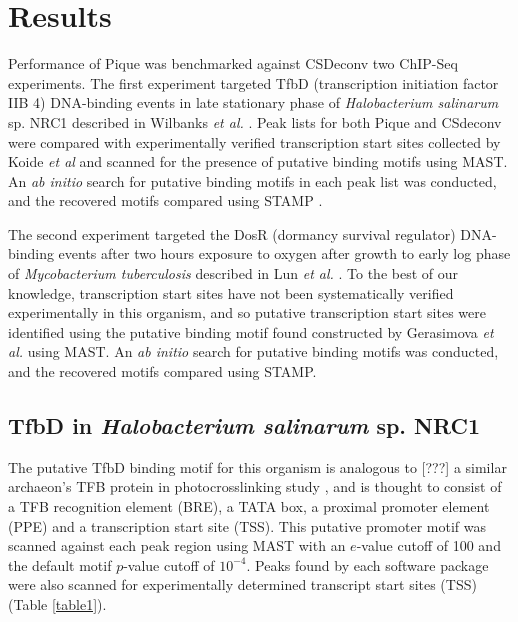 \documentclass{bioinfo}
\begin{document}
\section{Results}

Performance of Pique was benchmarked against CSDeconv two ChIP-Seq
experiments. The first experiment targeted TfbD (transcription
initiation factor IIB 4) DNA-binding events in late stationary phase
of {\em Halobacterium salinarum} sp. NRC1 described in Wilbanks {\em
  et al.} \cite{wilbanks}. Peak lists for both Pique and CSdeconv were
compared with experimentally verified transcription start sites
collected by Koide {\em et al} \cite{halo_promoters} and scanned for
the presence of putative binding motifs using MAST\cite{MAST}. An {\em
  ab initio} search for putative binding motifs in each peak list was
conducted, and the recovered motifs compared using STAMP \cite{STAMP}.

The second experiment targeted the DosR (dormancy survival regulator)
DNA-binding events after two hours exposure to oxygen after growth to
early log phase of {\em Mycobacterium tuberculosis} described in Lun
{\em et al.}  \cite{CSDeconv}. To the best of our knowledge,
transcription start sites have not been systematically verified
experimentally in this organism, and so putative transcription start
sites were identified using the putative binding motif found
constructed by Gerasimova {\em et al.} \cite{DosR_motif} using
MAST. An {\em ab initio} search for putative binding motifs was
conducted, and the recovered motifs compared using STAMP. 

\subsection{TfbD in {\em Halobacterium salinarum} sp. NRC1}

The putative TfbD binding motif for this organism is analogous to
[???] a similar archaeon's TFB protein in photocrosslinking study
\cite{tfb_promoter}, and is thought to consist of a TFB recognition
element (BRE), a TATA box, a proximal promoter element (PPE) and a
transcription start site (TSS). This putative promoter motif was
scanned against each peak region using MAST \cite{MAST} with an
$e$-value cutoff of 100 and the default motif $p$-value cutoff of
$10^{-4}$. Peaks found by each software package were also scanned for
experimentally determined transcript start sites (TSS)
\cite{halo_promoters} (Table \ref{table1}).
\end{document}
